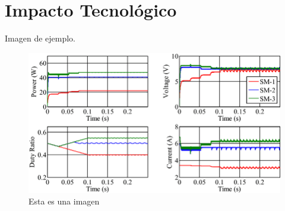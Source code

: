 \chapter{Impacto Tecnológico}
\label{Impacto Tecnológico}

Imagen de ejemplo.

\begin{figure}[H]
\begin{center}
\includegraphics[width=1\linewidth,frame]{imagenes/Simulation-PSC.png}
\caption{Esta es una imagen}
\label{SimulacionPSC}
\end{center}
\end{figure}